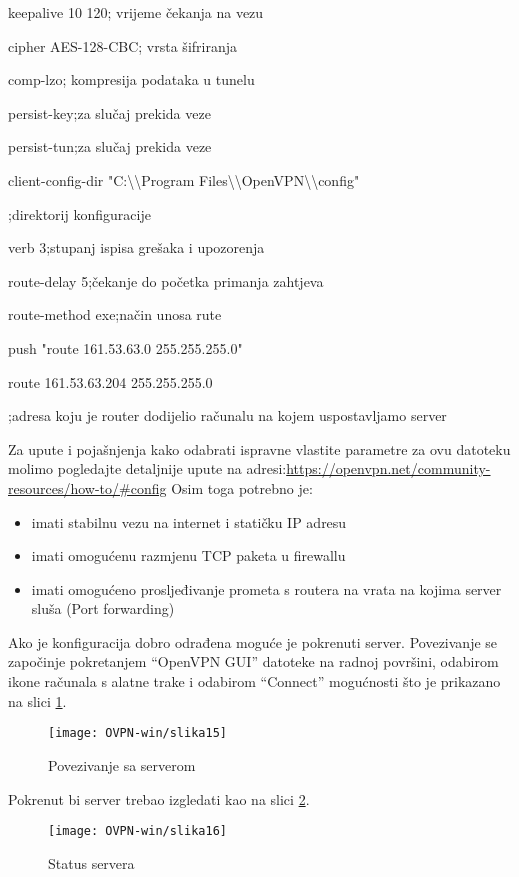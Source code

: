 {keepalive 10 120\hfill; vrijeme čekanja na vezu

cipher AES-128-CBC\hfill; vrsta šifriranja

comp-lzo\hfill; kompresija podataka u tunelu

persist-key\hfill;za slučaj prekida veze

persist-tun\hfill;za slučaj prekida veze

client-config-dir "C:\textbackslash \textbackslash Program Files\textbackslash \textbackslash OpenVPN\textbackslash \textbackslash config"\hfill

;direktorij konfiguracije

verb 3\hfill;stupanj ispisa grešaka i upozorenja

route-delay 5\hfill;čekanje do početka primanja zahtjeva

route-method exe\hfill;način unosa rute

push "route 161.53.63.0 255.255.255.0" 

route 161.53.63.204 255.255.255.0\hfill

;adresa koju je router dodijelio računalu na kojem uspostavljamo server
}\bigbreak
Za upute i pojašnjenja kako odabrati ispravne vlastite parametre za ovu datoteku molimo pogledajte detaljnije upute na adresi:\smallbreak \url{https://openvpn.net/community-resources/how-to/\#config}\smallbreak
Osim toga potrebno je:
\begin{itemize}
	\item imati stabilnu vezu na internet i statičku IP adresu
	\item imati omogućenu razmjenu TCP paketa u firewallu
	\item imati omogućeno prosljeđivanje prometa s routera na vrata na kojima server sluša (Port forwarding)
\end{itemize}	
	
Ako je konfiguracija dobro odrađena moguće je pokrenuti server. Povezivanje se započinje pokretanjem ``OpenVPN GUI'' datoteke na radnoj površini, odabirom ikone računala s alatne trake i odabirom ``Connect'' mogućnosti što je prikazano na slici \ref{fig:povezivanje-open}. 
\begin{figure}[h!]
	\centering
     \texttt{[image: OVPN-win/slika15]}
     \caption{Povezivanje sa serverom}
     \label{fig:povezivanje-open}
\end{figure}
\FloatBarrier 	
Pokrenut bi server trebao izgledati kao na slici \ref{fig:status-open}.
\begin{figure}[h!]
	\centering
     \texttt{[image: OVPN-win/slika16]}
     \caption{Status servera}
     \label{fig:status-open}
\end{figure}
\FloatBarrier
\newpage
